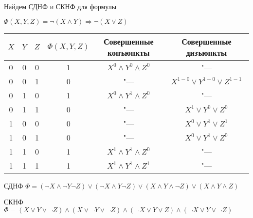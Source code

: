 \begin{example}
    Найдем СДНФ и СКНФ для формулы

    $\Phi(X,Y,Z) = \lnot(X\land Y)\Rightarrow\lnot(X\lor Z)$

    \begin{center}
        \begin{tabular}{|c|c|c|c|c|c|}
            \hline
            $X$ & $Y$ & $Z$ & $\Phi(X,Y,Z)$ & Совершенные конъюнкты     & Совершенные дизъюнкты              \\ \hline
            0   & 0   & 0   & 1             & $X^0\land Y^0 \land Z^0$  & "---                               \\ \hline
            0   & 0   & 1   & 0             & "---                      & $X^{1-0}\lor Y^{1-0} \lor Z^{1-1}$ \\ \hline
            0   & 1   & 0   & 1             & $X^0 \land Y^1 \land Z^0$ & "---                               \\ \hline
            0   & 1   & 1   & 0             & "---                      & $X^1 \lor Y^0 \lor Z^0$            \\ \hline
            1   & 0   & 0   & 0             & "---                      & $X^0 \lor Y^1 \lor Z^1$            \\ \hline
            1   & 0   & 1   & 0             & "---                      & $X^0 \lor Y^1 \lor Z^0$            \\ \hline
            1   & 1   & 0   & 1             & $X^1 \land Y^1 \land Z^0$ & "---                               \\ \hline
            1   & 1   & 1   & 1             & $X^1 \land Y^1 \land Z^1$ & "---                               \\ \hline
            \end{tabular}
    \end{center}

    СДНФ $\Phi = (\lnot X \land\lnot Y \lnot Z)\lor(\lnot X\land Y \lnot Z)\lor(X\land Y\land \lnot Z)\lor(X\land Y \land Z)$

    СКНФ $\Phi = (X\lor Y\lor \lnot Z)\land(X\lor \lnot Y \lor \lnot Z)\land(\lnot X \lor Y \lor Z)\land(\lnot X\lor Y \lor \lnot Z)$

\end{example}